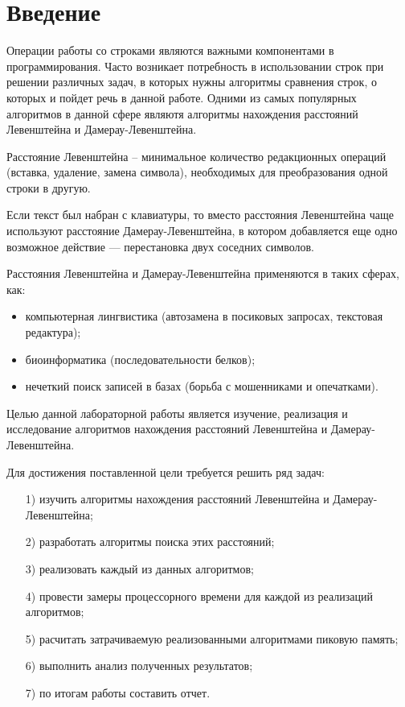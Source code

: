 
\chapter*{Введение}

Операции работы со строками являются важными компонентами в программирования. Часто возникает потребность в использовании строк при решении различных
задач, в которых нужны алгоритмы сравнения строк, о которых
и пойдет речь в данной работе. Одними из самых популярных алгоритмов в данной сфере являютя алгоритмы нахождения расстояний Левенштейна и Дамерау-Левенштейна.

Расстояние Левенштейна – минимальное количество редакционных операций (вставка, удаление, замена символа), необходимых для преобразования одной строки в другую. 

Если текст был набран с клавиатуры, то вместо расстояния Левенштейна чаще используют расстояние Дамерау-Левенштейна, в котором добавляется еще одно возможное действие --- перестановка двух соседних символов.

Расстояния Левенштейна и Дамерау-Левенштейна применяются в таких сферах, как: 
\begin{itemize}
	\item компьютерная лингвистика (автозамена в посиковых запросах, текстовая редактура);
	\item биоинформатика (последовательности белков);
	\item нечеткий поиск записей в базах (борьба с мошенниками и опечатками).
\end{itemize}

Целью данной лабораторной работы является изучение, реализация и исследование
алгоритмов нахождения расстояний Левенштейна и Дамерау-Левенштейна.

Для достижения поставленной цели требуется решить ряд задач:
\begin{enumerate}
	\item[1)] изучить алгоритмы нахождения расстояний Левенштейна и Дамерау-Левенштейна;
	\item[2)] разработать алгоритмы поиска этих расстояний;
	\item[3)] реализовать каждый из данных алгоритмов;
	\item[4)] провести замеры процессорного времени для каждой из реализаций алгоритмов;
	\item[5)] расчитать затрачиваемую реализованными алгоритмами пиковую память;
 	\item[6)] выполнить анализ полученных результатов;
	\item[7)] по итогам работы составить отчет.
\end{enumerate}

\newpage

